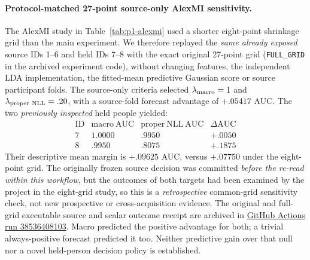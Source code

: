 \paragraph{Protocol-matched 27-point source-only AlexMI sensitivity.}
The AlexMI study in Table~\ref{tab:p1-alexmi}
used a shorter eight-point shrinkage grid than
the main experiment. We therefore replayed the
\emph{same already exposed} source IDs 1--6 and
held IDs 7--8 with the exact original 27-point grid
(\texttt{FULL\_GRID} in the archived experiment code), without
changing features, the independent LDA implementation,
the fitted-mean predictive Gaussian score or source
participant folds. The source-only criteria selected
\(\lambda_{\rm macro}=1\) and
\(\lambda_{\rm proper\ NLL}=.20\),
with a source-fold forecast advantage of
\( +.05417\) AUC. The two \emph{previously
inspected} held people yielded:
\[
\begin{array}{c|rrr}
 \mathrm{ID}&\mathrm{macro\ AUC}&
 \mathrm{proper\ NLL\ AUC}&\Delta \mathrm{AUC}\\\hline
 7&1.0000&.9950&+.0050\\
 8&.9950&.8075&+.1875
\end{array}
\]
Their descriptive mean margin is \(+.09625\) AUC,
versus \(+.07750\) under the eight-point grid.
The originally frozen source decision was committed
\emph{before the re-read within this workflow},
but the outcomes of both targets had been examined
by the project in the eight-grid study, so this
is a \emph{retrospective} common-grid sensitivity
check, not new prospective or cross-acquisition
evidence. The original and full-grid executable
source and scalar outcome receipt are archived in
\href{https://github.com/lindicaphxag-tech/kaggle/actions/runs/38536408103}
{GitHub Actions run 38536408103}.
Macro predicted the positive advantage for both;
a trivial always-positive forecast predicted it too.
Neither predictive gain over that null nor
a novel held-person decision policy is established.

